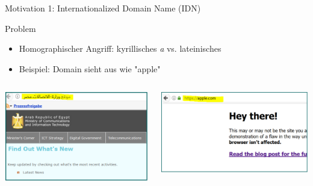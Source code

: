 \documentclass[xelatex,aspectratio=169]{beamer}
\begin{document}
\begin{frame}{Motivation 1: Internationalized Domain Name (IDN)}
    \begin{alertblock}{Problem}
        \begin{itemize}
            \item Homographischer Angriff: kyrillisches \textit{a} vs. lateinisches
            \item Beispiel: Domain sieht aus wie "apple"
        \end{itemize}

    \end{alertblock}
    \begin{columns}
        \begin{column}{0.5\textwidth}
            \includegraphics[width=\textwidth]{img/codierung_arabic.png}
        \end{column}
        \begin{column}{0.5\textwidth}
            \includegraphics[width=\textwidth]{img/codierung_cyrillic_a.png}
        \end{column}
    \end{columns}
\end{frame}
\end{document}
